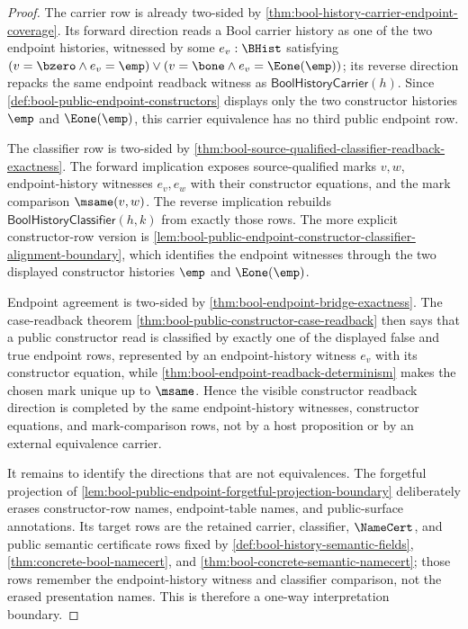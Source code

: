 \begin{proof}
The carrier row is already two-sided by \autoref{thm:bool-history-carrier-endpoint-coverage}. Its forward direction reads a Bool carrier history as one of the two endpoint histories, witnessed by some $e_v:\BHist$ satisfying $(v=\bzero \land e_v=\emp)\lor(v=\bone \land e_v=\Eone(\emp))$; its reverse direction repacks the same endpoint readback witness as $\mathsf{BoolHistoryCarrier}(h)$. Since \autoref{def:bool-public-endpoint-constructors} displays only the two constructor histories $\emp$ and $\Eone(\emp)$, this carrier equivalence has no third public endpoint row.

The classifier row is two-sided by \autoref{thm:bool-source-qualified-classifier-readback-exactness}. The forward implication exposes source-qualified marks $v,w$, endpoint-history witnesses $e_v,e_w$ with their constructor equations, and the mark comparison $\msame(v,w)$. The reverse implication rebuilds $\mathsf{BoolHistoryClassifier}(h,k)$ from exactly those rows. The more explicit constructor-row version is \autoref{lem:bool-public-endpoint-constructor-classifier-alignment-boundary}, which identifies the endpoint witnesses through the two displayed constructor histories $\emp$ and $\Eone(\emp)$.

Endpoint agreement is two-sided by \autoref{thm:bool-endpoint-bridge-exactness}. The case-readback theorem \autoref{thm:bool-public-constructor-case-readback} then says that a public constructor read is classified by exactly one of the displayed false and true endpoint rows, represented by an endpoint-history witness $e_v$ with its constructor equation, while \autoref{thm:bool-endpoint-readback-determinism} makes the chosen mark unique up to $\msame$. Hence the visible constructor readback direction is completed by the same endpoint-history witnesses, constructor equations, and mark-comparison rows, not by a host proposition or by an external equivalence carrier.

It remains to identify the directions that are not equivalences. The forgetful projection of \autoref{lem:bool-public-endpoint-forgetful-projection-boundary} deliberately erases constructor-row names, endpoint-table names, and public-surface annotations. Its target rows are the retained carrier, classifier, $\NameCert$, and public semantic certificate rows fixed by \autoref{def:bool-history-semantic-fields}, \autoref{thm:concrete-bool-namecert}, and \autoref{thm:bool-concrete-semantic-namecert}; those rows remember the endpoint-history witness and classifier comparison, not the erased presentation names. This is therefore a one-way interpretation boundary.


\end{proof}
